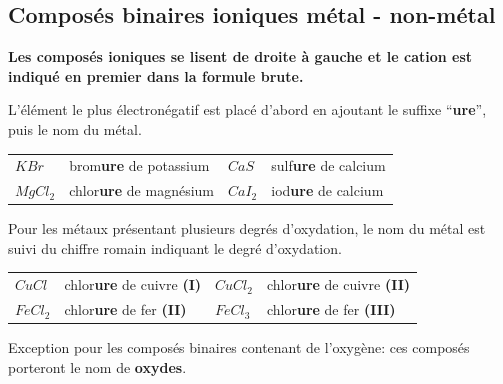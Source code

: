 \documentclass[
  11pt,
  a4paper,
  openany]{book}
\begin{document}
\hypertarget{composuxe9s-binaires-ioniques-muxe9tal---non-muxe9tal}{%
\subsection{Composés binaires ioniques \textbar{} métal - non-métal}\label{composuxe9s-binaires-ioniques-muxe9tal---non-muxe9tal}}

\textbf{Les composés ioniques se lisent de droite à gauche et le cation est indiqué en premier dans la formule brute.}

L'élément le plus électronégatif est placé d'abord en ajoutant le suffixe ``\textbf{ure}'', puis le nom du métal.

\begin{longtable}[]{@{}
  >{\centering\arraybackslash}p{}
  >{\raggedright\arraybackslash}p{}
  >{\centering\arraybackslash}p{}
  >{\raggedright\arraybackslash}p{}@{}}
\toprule()
\endhead
\(KBr\) & brom\textbf{ure} de potassium & \(CaS\) & sulf\textbf{ure} de calcium \\
\(MgCl_2\) & chlor\textbf{ure} de magnésium & \(CaI_2\) & iod\textbf{ure} de calcium \\
\bottomrule()
\end{longtable}

Pour les métaux présentant plusieurs degrés d'oxydation, le nom du métal est suivi du chiffre romain indiquant le degré d'oxydation.

\begin{longtable}[]{@{}
  >{\centering\arraybackslash}p{}
  >{\raggedright\arraybackslash}p{}
  >{\centering\arraybackslash}p{}
  >{\raggedright\arraybackslash}p{}@{}}
\toprule()
\endhead
\(CuCl\) & chlor\textbf{ure} de cuivre \textbf{(I)} & \(CuCl_2\) & chlor\textbf{ure} de cuivre \textbf{(II)} \\
\(FeCl_2\) & chlor\textbf{ure} de fer \textbf{(II)} & \(FeCl_3\) & chlor\textbf{ure} de fer \textbf{(III)} \\
\bottomrule()
\end{longtable}

Exception pour les composés binaires contenant de l'oxygène: ces composés porteront le nom de \textbf{oxydes}.
\end{document}
